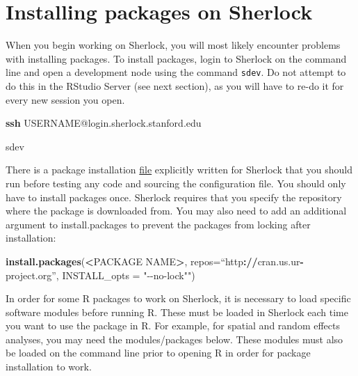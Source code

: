 \documentclass[
]{book}
\newenvironment{Shaded}{\begin{snugshade}}{\end{snugshade}}
\newcommand{\AttributeTok}[1]{\textcolor[rgb]{0.13,0.29,0.53}{#1}}
\newcommand{\ErrorTok}[1]{\textcolor[rgb]{0.64,0.00,0.00}{\textbf{#1}}}
\newcommand{\ExtensionTok}[1]{#1}
\newcommand{\FunctionTok}[1]{\textcolor[rgb]{0.13,0.29,0.53}{\textbf{#1}}}
\newcommand{\NormalTok}[1]{#1}
\newcommand{\SpecialCharTok}[1]{\textcolor[rgb]{0.81,0.36,0.00}{\textbf{#1}}}
\newcommand{\StringTok}[1]{\textcolor[rgb]{0.31,0.60,0.02}{#1}}
\begin{document}
\section{Installing packages on Sherlock}\label{installing-packages-on-sherlock}

When you begin working on Sherlock, you will most likely encounter problems with installing packages. To install packages, login to Sherlock on the command line and open a development node using the command \texttt{sdev}. Do not attempt to do this in the RStudio Server (see next section), as you will have to re-do it for every new session you open.

\begin{Shaded}
\begin{Highlighting}[]
\FunctionTok{ssh}\NormalTok{ USERNAME@login.sherlock.stanford.edu}

\ExtensionTok{sdev}
\end{Highlighting}
\end{Shaded}

There is a package installation \href{https://drive.google.com/file/d/1eybh4j_G-r3pMZBCVA4QHoWZBo_cW5zb/view}{file} explicitly written for Sherlock that you should run before testing any code and sourcing the configuration file. You should only have to install packages once. Sherlock requires that you specify the repository where the package is downloaded from. You may also need to add an additional argument to install.packages to prevent the packages from locking after installation:

\begin{Shaded}
\begin{Highlighting}[]
\FunctionTok{install.packages}\NormalTok{(}\SpecialCharTok{\textless{}}\NormalTok{PACKAGE NAME}\SpecialCharTok{\textgreater{}}\NormalTok{, }\AttributeTok{repos=}\NormalTok{“http}\SpecialCharTok{:}\ErrorTok{//}\NormalTok{cran.us.ur}\SpecialCharTok{{-}}\NormalTok{project.org”, }
                  \AttributeTok{INSTALL\_opts =} \StringTok{"{-}{-}no{-}lock"")}
\end{Highlighting}
\end{Shaded}

In order for some R packages to work on Sherlock, it is necessary to load specific software modules before running R. These must be loaded in Sherlock each time you want to use the package in R. For example, for spatial and random effects analyses, you may need the modules/packages below. These modules must also be loaded on the command line prior to opening R in order for package installation to work.
\end{document}
